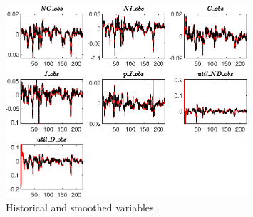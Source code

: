  
\begin{figure}[H]
\centering 
\includegraphics[width=0.80\textwidth]{BRS_sectoral_wo_gmf/graphs/BRS_sectoral_wo_gmf_HistoricalAndSmoothedVariables1}
\caption{Historical and smoothed variables.}\label{Fig:HistoricalAndSmoothedVariables:1}
\end{figure}


